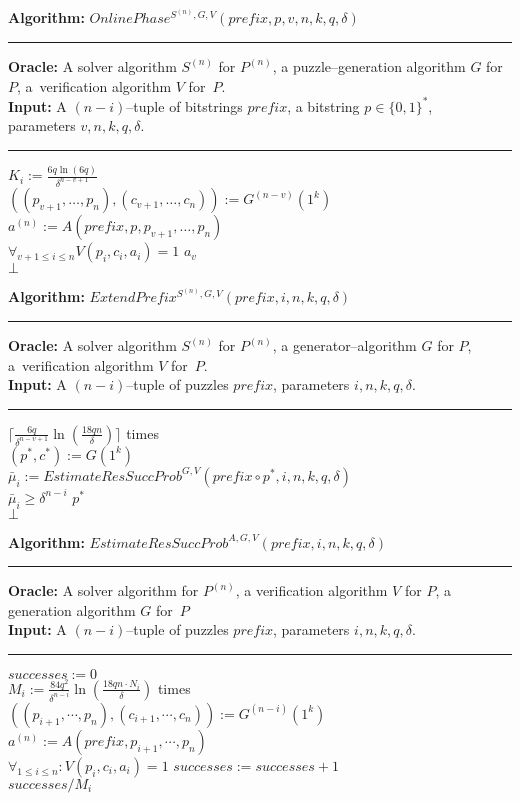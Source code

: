 \documentclass[11pt,a4paper,titlepage]{memoir}
\begin{document}
\begin{codeblock}
  \textbf{Algorithm:} $\mathit{OnlinePhase^{S^{(n)}, G, V}(\mathit{prefix}, p, v, n, k, q, \delta)}$
  \medskip \hrule
  \textbf{Oracle:} A solver algorithm $S^{(n)}$ for $P^{(n)}$, a puzzle--generation algorithm $G$ for $P$, a~verification algorithm $V$ for~$P$.\\
  \textbf{Input:} A $(n-i)$--tuple of bitstrings $\mathit{prefix}$, a bitstring $p \in \{0,1\}^{*}$, \\ parameters $v, n, k, q, \delta$.
  \medskip\hrule
  \Repeat $K_i := \frac{6q \ln (6q)}{\delta^{n-v+1}}$ \\
  \IndI $((p_{v+1}, \dotsc, p_{n}),(c_{v+1}, \dots, c_n)) := G^{(n-v)}(1^k)$\\
  \IndI $a^{(n)} := A(\mathit{prefix}, p, p_{v+1}, \dotsc, p_n)$\\
  \IndI \If $\forall_{v+1 \leq i \leq n} V(p_i, c_i, a_i) = 1$ \Then \Return $a_v$\\
  \Return $\bot$
\end{codeblock}
%
\begin{codeblock}
  \textbf{Algorithm:} $\mathit{ExtendPrefix^{S^{(n)}, G,V}(prefix, i, n, k, q, \delta)}$
  \medskip \hrule
  \textbf{Oracle:} A solver algorithm $S^{(n)}$ for $P^{(n)}$, a generator--algorithm $G$ for $P$, a~verification algorithm $V$ for~$P$.\\
  \textbf{Input:} A $(n-i)$--tuple of puzzles $\mathit{prefix}$, parameters $i, n, k, q, \delta$.
  \medskip\hrule
  \Repeat $\Big\lceil \frac{6q}{\delta^{n-v+1}} \ln (\frac{18qn}{\delta}) \Big\rceil$ times \Do \\
  \IndI $(p^*, c^*) := G(1^k) $\\
  \IndI $\bar{\mu}_i := \mathit{EstimateResSuccProb}^{G,V}(\mathit{prefix} \circ p^*, i, n, k, q, \delta)$\\
  \IndI \If $\bar{\mu}_i \geq \delta^{n-i}$ \Then \Return $p^*$ \\
  \Return $\bot$
\end{codeblock}
%
\begin{codeblock}
  \textbf{Algorithm:} $\mathit{EstimateResSuccProb}^{A, G,V}(\mathit{prefix}, i, n, k, q, \delta)$
  \medskip \hrule
  \textbf{Oracle:} A solver algorithm for $P^{(n)}$, a verification algorithm $V$ for $P$, a generation algorithm $G$ for~$P$\\
  \textbf{Input:} A $(n-i)$--tuple of puzzles $\mathit{prefix}$, parameters $i, n, k, q, \delta$.
  \medskip\hrule
  $successes := 0$ \\
  \Repeat $M_i := \frac{84q^2}{\delta^{n-i}} \ln(\frac{18qn \cdot N_i}{\delta})$ times \\
  \IndI $((p_{i+1}, \cdots, p_n), (c_{i+1}, \cdots, c_n)) := G^{(n-i)}(1^k)$\\
  \IndI $a^{(n)} := A(\mathit{prefix}, p_{i+1}, \cdots, p_{n})$\\
  \IndI \If $\forall_{1 \leq i \leq n} : V(p_i, c_i, a_i) = 1$ \Then $\mathit{successes := successes + 1}$ \\
  \Return $successes / M_i$
\end{codeblock}
\end{document}
